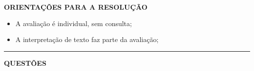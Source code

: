 \documentclass[12pt,a4paper]{article}
\begin{document}
\vspace{0.3cm}

\textbf{ORIENTAÇÕES PARA A RESOLUÇÃO}  

\begin{itemize}
    \item A avaliação é individual, sem consulta;
    \item A interpretação de texto faz parte da avaliação;
\end{itemize}

\vspace{0.5cm}

\begin{center}
    \rule{\textwidth}{0.4pt}
    \textbf{QUESTÕES}
\end{center}

\vspace{0.5cm} 
\end{document}
